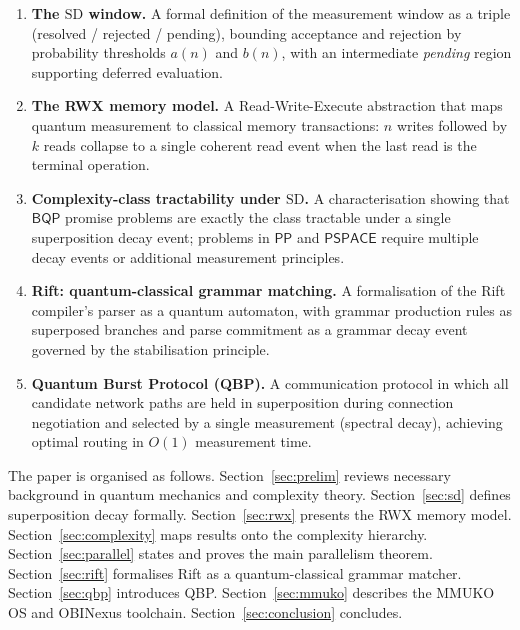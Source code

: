 \documentclass[12pt, a4paper]{article}
\theoremstyle{plain}
\theoremstyle{definition}
\theoremstyle{remark}
\newcommand{\pspace}{\ensuremath{\mathsf{PSPACE}}}
\newcommand{\bqp}{\ensuremath{\mathsf{BQP}}}
\newcommand{\pp}{\ensuremath{\mathsf{PP}}}
\newcommand{\SD}{\ensuremath{\mathrm{SD}}}   %
\begin{document}
\begin{enumerate}[label=\textbf{C\arabic*.}]
  \item \textbf{The \SD{} window.}  A formal definition of the measurement
        window as a triple (resolved / rejected / pending), bounding
        acceptance and rejection by probability thresholds $a(n)$ and $b(n)$,
        with an intermediate \emph{pending} region supporting deferred
        evaluation.

  \item \textbf{The RWX memory model.}  A Read-Write-Execute abstraction that
        maps quantum measurement to classical memory transactions: $n$ writes
        followed by $k$ reads collapse to a single coherent read event when
        the last read is the terminal operation.

  \item \textbf{Complexity-class tractability under \SD.}  A characterisation
        showing that $\bqp$ promise problems are exactly the class tractable
        under a single superposition decay event; problems in $\pp$ and
        $\pspace$ require multiple decay events or additional measurement
        principles.

  \item \textbf{Rift: quantum-classical grammar matching.}  A formalisation
        of the Rift compiler's parser as a quantum automaton, with grammar
        production rules as superposed branches and parse commitment as a
        grammar decay event governed by the stabilisation principle.

  \item \textbf{Quantum Burst Protocol (QBP).}  A communication protocol in
        which all candidate network paths are held in superposition during
        connection negotiation and selected by a single measurement (spectral
        decay), achieving optimal routing in $O(1)$ measurement time.
\end{enumerate}

The paper is organised as follows.  Section~\ref{sec:prelim} reviews necessary
background in quantum mechanics and complexity theory.  Section~\ref{sec:sd}
defines superposition decay formally.  Section~\ref{sec:rwx} presents the
RWX memory model.  Section~\ref{sec:complexity} maps results onto the
complexity hierarchy.  Section~\ref{sec:parallel} states and proves the main
parallelism theorem.  Section~\ref{sec:rift} formalises Rift as a
quantum-classical grammar matcher.  Section~\ref{sec:qbp} introduces QBP.
Section~\ref{sec:mmuko} describes the MMUKO OS and OBINexus toolchain.
Section~\ref{sec:conclusion} concludes.
\end{document}
